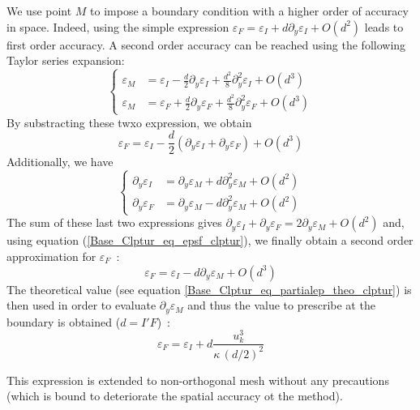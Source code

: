 We use point $M$ to impose a boundary condition with a higher order of 
accuracy in space. 
 Indeed, using the simple expression 
$\varepsilon_F=\varepsilon_I+d\partial_y\varepsilon_I + O(d^2)$ leads to  
first order accuracy.
 A second order accuracy can be reached 
 using the following Taylor series expansion:
\begin{equation}
\left\{\begin{array}{ll}
\varepsilon_M&=\varepsilon_I-\displaystyle\frac{d}{2}\partial_y\varepsilon_I+\displaystyle\frac{d^2}{8}\partial^2_y\varepsilon_I+O(d^3)\\
\varepsilon_M&=\varepsilon_F+\displaystyle\frac{d}{2}\partial_y\varepsilon_F+\displaystyle\frac{d^2}{8}\partial^2_y\varepsilon_F+O(d^3)
\end{array}\right.
\end{equation}
By substracting these twxo expression, we obtain
\begin{equation}\label{Base_Clptur_eq_epsf_clptur}
\varepsilon_F=\varepsilon_I-\displaystyle\frac{d}{2}(\partial_y\varepsilon_I+\partial_y\varepsilon_F)+O(d^3)
\end{equation}
Additionally, we have
\begin{equation}
\left\{\begin{array}{ll}
\partial_y\varepsilon_I&=\partial_y\varepsilon_M+d\partial^2_y\varepsilon_M+O(d^2)\\
\partial_y\varepsilon_F&=\partial_y\varepsilon_M-d\partial^2_y\varepsilon_M+O(d^2)
\end{array}\right.
\end{equation}
The sum of these last two expressions gives 
$\partial_y\varepsilon_I+\partial_y\varepsilon_F=2\partial_y\varepsilon_M+O(d^2)$ and, 
using equation 
(\ref{Base_Clptur_eq_epsf_clptur}), we finally obtain a second order
approximation for $\varepsilon_F$~:
\begin{equation}
\varepsilon_F=\varepsilon_I-d\partial_y\varepsilon_M+O(d^3)
\end{equation}
The theoretical value (see equation \ref{Base_Clptur_eq_partialep_theo_clptur})
is then used in order to evaluate 
 $\partial_y\varepsilon_M$ and thus the value to prescribe at
the boundary is obtained ($d=I'F$)~:
\begin{equation}
\varepsilon_F=\varepsilon_I+d\displaystyle\frac{ u_k^3}{\kappa\, (d/2)^2}
\end{equation}

This expression is extended to non-orthogonal mesh without any precautions 
(which is bound to deteriorate the spatial accuracy ot the method).  

